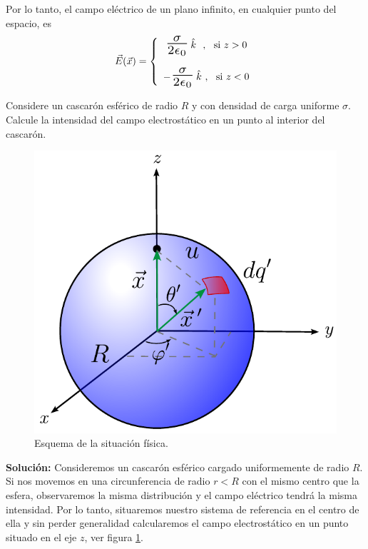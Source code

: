 \begin{ejemplo}
Por lo tanto, el campo eléctrico de un plano infinito, en cualquier punto del espacio, es
\begin{equation*}
\vec{E}(\vec{x}) = \left\{ \begin{array}{c}
\scaleto{\frac{\sigma}{2 \epsilon_0}}{20pt} \, \hat{k} ~~,~~ \mbox{si} ~z>0 \\ \\
-\scaleto{\frac{\sigma}{2 \epsilon_0} }{20pt}\, \hat{k} ~,~~\mbox{si}  ~z<0
\end{array} \right.
\end{equation*}
\end{ejemplo}

\begin{ejemplo}
    Considere un cascarón esférico de radio $R$ y con densidad de carga uniforme $\sigma$. Calcule la intensidad del campo electrostático en un punto al interior del cascarón.
    
\begin{figure}[H]
    \centering
    \includegraphics[scale = 0.65]{Figuras/Ej-E-Cascaron-Esferico.pdf}
    \caption{Esquema de la situación física.}
    \label{fig:Ej-E-Cascaron}
\end{figure}

\textbf{Solución:} Consideremos un cascarón esférico cargado uniformemente de radio $R$. Si nos movemos en una circunferencia de radio $r < R$ con el mismo centro que la esfera, observaremos la misma distribución y el campo eléctrico tendrá la misma intensidad. Por lo tanto, situaremos nuestro sistema de referencia en el centro de ella y sin perder generalidad calcularemos el campo electrostático en un punto situado en el eje $z$, ver figura \ref{fig:Ej-E-Cascaron}.


\end{ejemplo}
